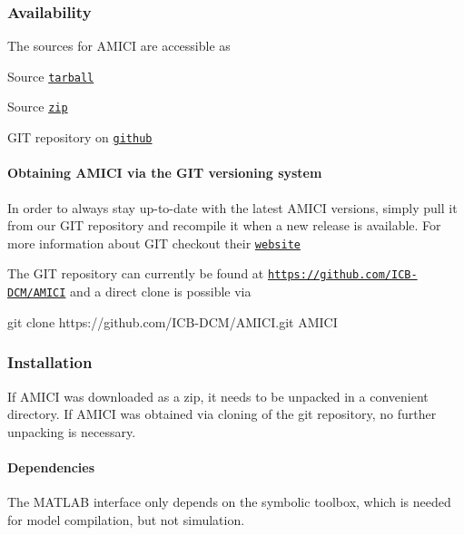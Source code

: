 \subsubsection*{Availability}

The sources for A\+M\+I\+CI are accessible as
\begin{DoxyItemize}
\item Source \href{https://github.com/ICB-DCM/AMICI/tarball/master}{\tt tarball}
\item Source \href{https://github.com/ICB-DCM/AMICI/zipball/master}{\tt zip}
\item G\+IT repository on \href{https://github.com/ICB-DCM/AMICI}{\tt github}
\end{DoxyItemize}

\paragraph*{Obtaining A\+M\+I\+CI via the G\+IT versioning system}

In order to always stay up-\/to-\/date with the latest A\+M\+I\+CI versions, simply pull it from our G\+IT repository and recompile it when a new release is available. For more information about G\+IT checkout their \href{http://git-scm.com/}{\tt website}

The G\+IT repository can currently be found at \href{https://github.com/ICB-DCM/AMICI}{\tt https\+://github.\+com/\+I\+C\+B-\/\+D\+C\+M/\+A\+M\+I\+CI} and a direct clone is possible via \begin{DoxyVerb}git clone https://github.com/ICB-DCM/AMICI.git AMICI
\end{DoxyVerb}


\subsubsection*{Installation}

If A\+M\+I\+CI was downloaded as a zip, it needs to be unpacked in a convenient directory. If A\+M\+I\+CI was obtained via cloning of the git repository, no further unpacking is necessary.

\paragraph*{Dependencies}

The M\+A\+T\+L\+AB interface only depends on the symbolic toolbox, which is needed for model compilation, but not simulation.

